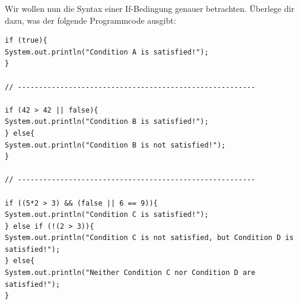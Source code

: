 \item Wir wollen nun die Syntax einer If-Bedingung genauer betrachten. Überlege dir dazu, was der folgende Programmcode ausgibt:
\begin{lstlisting}[breaklines=true]
if (true){
System.out.println("Condition A is satisfied!");
}

// --------------------------------------------------------

if (42 > 42 || false){
System.out.println("Condition B is satisfied!");
} else{
System.out.println("Condition B is not satisfied!");
}
    
// --------------------------------------------------------
    
if ((5*2 > 3) && (false || 6 == 9)){
System.out.println("Condition C is satisfied!");
} else if (!(2 > 3)){
System.out.println("Condition C is not satisfied, but Condition D is satisfied!");
} else{
System.out.println("Neither Condition C nor Condition D are satisfied!");
}
\end{lstlisting}


